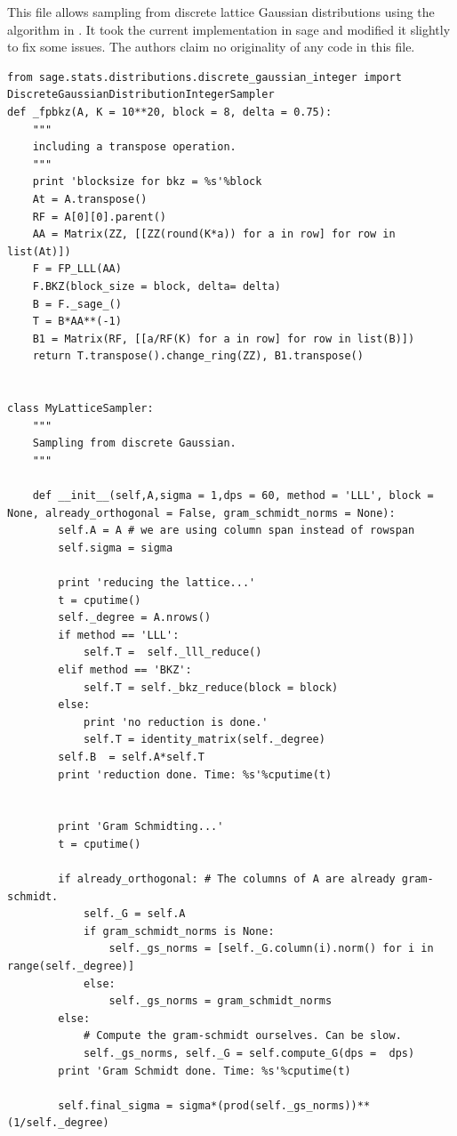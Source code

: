 \documentclass[envcountsame]{llncs}
\begin{document}
\normalsize
This file allows sampling from discrete lattice Gaussian distributions using the algorithm in \cite{gentry2008trapdoors}.
It took the current implementation in sage and modified it slightly to fix some issues. The authors claim no originality of any code in this file.
\scriptsize
\begin{verbatim}
from sage.stats.distributions.discrete_gaussian_integer import DiscreteGaussianDistributionIntegerSampler
def _fpbkz(A, K = 10**20, block = 8, delta = 0.75):
    """
    including a transpose operation.
    """
    print 'blocksize for bkz = %s'%block
    At = A.transpose()
    RF = A[0][0].parent()
    AA = Matrix(ZZ, [[ZZ(round(K*a)) for a in row] for row in list(At)])
    F = FP_LLL(AA)
    F.BKZ(block_size = block, delta= delta)
    B = F._sage_()
    T = B*AA**(-1)
    B1 = Matrix(RF, [[a/RF(K) for a in row] for row in list(B)])
    return T.transpose().change_ring(ZZ), B1.transpose()


class MyLatticeSampler:
    """
    Sampling from discrete Gaussian.
    """

    def __init__(self,A,sigma = 1,dps = 60, method = 'LLL', block = None, already_orthogonal = False, gram_schmidt_norms = None):
        self.A = A # we are using column span instead of rowspan
        self.sigma = sigma

        print 'reducing the lattice...'
        t = cputime()
        self._degree = A.nrows()
        if method == 'LLL':
            self.T =  self._lll_reduce()
        elif method == 'BKZ':
            self.T = self._bkz_reduce(block = block)
        else:
            print 'no reduction is done.'
            self.T = identity_matrix(self._degree)
        self.B  = self.A*self.T
        print 'reduction done. Time: %s'%cputime(t)


        print 'Gram Schmidting...'
        t = cputime()

        if already_orthogonal: # The columns of A are already gram-schmidt.
            self._G = self.A
            if gram_schmidt_norms is None:
                self._gs_norms = [self._G.column(i).norm() for i in range(self._degree)]
            else:
                self._gs_norms = gram_schmidt_norms
        else:
            # Compute the gram-schmidt ourselves. Can be slow.
            self._gs_norms, self._G = self.compute_G(dps =  dps)
        print 'Gram Schmidt done. Time: %s'%cputime(t)

        self.final_sigma = sigma*(prod(self._gs_norms))**(1/self._degree)



\end{verbatim}
\end{document}
